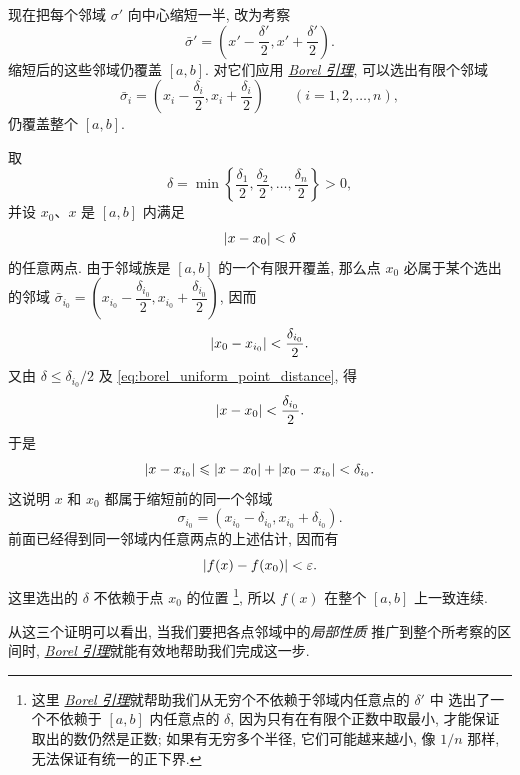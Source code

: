 现在把每个邻域 $\sigma'$ 向中心缩短一半, 改为考察
$$
\bar\sigma'=\left(x'-\frac{\delta'}2,x'+\frac{\delta'}2\right).
$$
缩短后的这些邻域仍覆盖 $[a,b]$.
对它们应用 \hyperref[lem:borel_finite_cover]{\emph{Borel 引理}}, 可以选出有限个邻域
$$
\bar\sigma_i=\left(x_i-\frac{\delta_i}2,x_i+\frac{\delta_i}2\right)
\qquad(i=1,2,\ldots,n),
$$
仍覆盖整个 $[a,b]$.

取
$$
\delta=\min\left\{\frac{\delta_1}2,\frac{\delta_2}2,\ldots,\frac{\delta_n}2\right\}>0,
$$
并设 $x_0$、$x$ 是 $[a,b]$ 内满足
\begin{equation}\label{eq:borel_uniform_point_distance}
\left| x-x_0 \right|<\delta
\end{equation}
的任意两点.
由于邻域族是 $[a,b]$ 的一个有限开覆盖, 
那么点 $x_0$ 必属于某个选出的邻域 $\bar\sigma_{i_0}=\left(x_{i_0}-\dfrac{\delta_{i_0}}2,x_{i_0}+\dfrac{\delta_{i_0}}2\right)$, 因而
$$
\left| x_0-x_{i_0} \right|<\frac{\delta_{i_0}}2.
$$
又由 $\delta\leq\delta_{i_0}/2$ 及 \eqref{eq:borel_uniform_point_distance}, 得
$$
\left| x-x_0 \right|<\frac{\delta_{i_0}}2.
$$
于是
$$
\left| x-x_{i_0} \right|
\leqslant\left| x-x_0 \right|+\left| x_0-x_{i_0} \right|<\delta_{i_0}.
$$
这说明 $x$ 和 $x_0$ 都属于缩短前的同一个邻域
$$
\sigma_{i_0}=(x_{i_0}-\delta_{i_0},x_{i_0}+\delta_{i_0}).
$$
前面已经得到同一邻域内任意两点的上述估计, 因而有
$$
\left| f(x)-f(x_0) \right|<\varepsilon.
$$
这里选出的 $\delta$ 不依赖于点 $x_0$ 的位置
\footnote{这里 \hyperref[lem:borel_finite_cover]{\emph{Borel 引理}}就帮助我们从无穷个不依赖于邻域内任意点的 $\delta'$ 中
选出了一个不依赖于 $[a,b]$ 内任意点的 $\delta$, 
因为只有在有限个正数中取最小, 才能保证取出的数仍然是正数;
如果有无穷多个半径, 它们可能越来越小, 像 \(1/n\) 那样, 无法保证有统一的正下界.},
所以 $f(x)$ 在整个 $[a,b]$ 上一致连续.

从这三个证明可以看出, 当我们要把各点邻域中的\emph{局部性质}
推广到整个所考察的区间时, \hyperref[lem:borel_finite_cover]{\emph{Borel 引理}}就能有效地帮助我们完成这一步.
